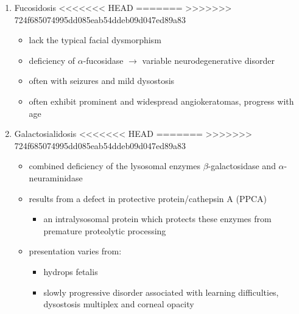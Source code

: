 \documentclass[fontsize=12pt]{scrartcl}
\begin{document}
\begin{enumerate}
\begin{enumerate}
\begin{enumerate}
\begin{enumerate}
\begin{table}[htbp]
\begin{enumerate}
\begin{enumerate}
\begin{enumerate}
\begin{enumerate}
\begin{enumerate}
\begin{itemize}
\begin{enumerate}
\begin{enumerate}
\item Fucosidosis
<<<<<<< HEAD
\label{sec:orgd3bfd63}
=======
\label{sec:orgd85bc36}
>>>>>>> 724f685074995dd085eab54ddeb09d047ed89a83
\begin{itemize}
\item lack the typical facial dysmorphism
\item deficiency of \(\alpha\)-fucosidase \(\to\) variable neurodegenerative disorder
\item often with seizures and mild dysostosis
\item often exhibit prominent and widespread angiokeratomas, progress with age
\end{itemize}

\item Galactosialidosis
<<<<<<< HEAD
\label{sec:orgdd6a191}
=======
\label{sec:orgb2bac42}
>>>>>>> 724f685074995dd085eab54ddeb09d047ed89a83
\begin{itemize}
\item combined deficiency of the lysosomal enzymes \(\beta\)-galactosidase and
\(\alpha\)-neuraminidase
\item results from a defect in protective protein/cathepsin A (PPCA)
\begin{itemize}
\item an intralysosomal protein which protects these enzymes from
premature proteolytic processing
\end{itemize}
\item presentation varies from:
\begin{itemize}
\item hydrops fetalis
\item slowly progressive disorder associated with learning
difficulties, dysostosis multiplex and corneal opacity
\end{itemize}
\end{itemize}
\end{enumerate}



\end{enumerate}
\end{itemize}
\end{enumerate}
\end{enumerate}
\end{enumerate}
\end{enumerate}
\end{enumerate}
\end{table}
\end{enumerate}
\end{enumerate}
\end{enumerate}
\end{enumerate}
\end{document}
